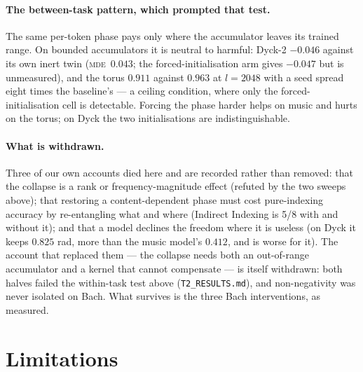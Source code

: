 \documentclass[10pt]{article}
\newcommand{\mde}{\textsc{mde}}
\begin{document}
\paragraph{The between-task pattern, which prompted that test.} The same per-token phase pays only where the accumulator
leaves its trained range. On bounded accumulators it is neutral to harmful: Dyck-2 $-0.046$ against its own inert twin (\mde\ $0.043$; the forced-initialisation arm gives $-0.047$ but is unmeasured), and the torus $0.911$ against $0.963$ at $l=2048$ with a seed spread eight times the baseline's --- a ceiling condition, where only the forced-initialisation cell is detectable.
Forcing the phase harder helps on music and hurts on the torus; on Dyck the two initialisations are indistinguishable. %

\paragraph{What is withdrawn.} Three of our own accounts died here and are recorded rather than removed:
that the collapse is a rank or frequency-magnitude effect (refuted by the two sweeps above); that restoring a
content-dependent phase must cost pure-indexing accuracy by re-entangling what and where (Indirect Indexing
is 5/8 with and without it); and that a model declines the freedom where it is useless (on Dyck it keeps
$0.825$ rad, more than the music model's $0.412$, and is worse for it). The account that replaced them ---
the collapse needs both an out-of-range accumulator and a kernel that cannot compensate --- is itself
withdrawn: both halves failed the within-task test above (\texttt{T2\_RESULTS.md}), and non-negativity was
never isolated on Bach. What survives is the three Bach interventions, as measured.

\section{Limitations}
\label{sec:limits}
\end{document}
